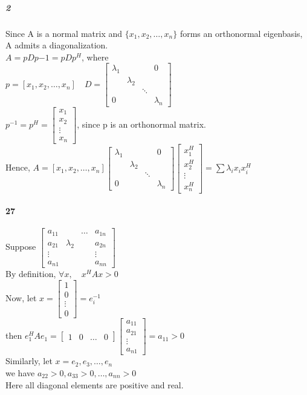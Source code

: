 \documentclass[10pt,letter]{article}
\begin{document}
\subparagraph{2}
Since A is a normal matrix and $\{x_1, x_2,\dots,x_n \}$ forms an orthonormal eigenbasis, A admits a diagonalization. \\
$A=pDp{-1}=pDp^H$, where \\
$p=[x_1, x_2,\dots,x_n]\quad D=\begin{bmatrix}
\lambda_1& & &0\\
 &\lambda_2& & \\
& &\ddots& \\
0& & & \lambda_n
\end{bmatrix}$\\
$p^{-1}=p^H=\begin{bmatrix}
x_1\\x_2\\\vdots\\x_n
\end{bmatrix}$, since p is an orthonormal matrix. \\
Hence,
$A=[x_1, x_2,\dots,x_n]\begin{bmatrix}
\lambda_1& & &0\\
&\lambda_2& & \\
& &\ddots& \\
0& & & \lambda_n
\end{bmatrix}\begin{bmatrix}
x_1^H\\x_2^H\\\vdots\\x_n^H
\end{bmatrix}=\sum \lambda_ix_ix_i^H$
\paragraph{27}
Suppose $\begin{bmatrix}
a_{11}& &\dots &a_{1n}\\
a_{21}&\lambda_2& &a_{2n}\\
\vdots& & &\vdots\\
a_{n1}& & & a_{nn}
\end{bmatrix}$\\
By definition, $\forall x, \quad x^HAx>0$\\
Now, let $x=\begin{bmatrix}
1\\0\\\vdots\\0
\end{bmatrix}=e_i^{-1}$\\
then $e_1^HAe_1=\begin{bmatrix}
1&0&\dots&0
\end{bmatrix}\begin{bmatrix}
a_{11}\\a_{21}\\\vdots\\a_{n1}
\end{bmatrix}=a_{11}>0$\\
Similarly, let $x=e_2,e_3,\dots, e_n$\\
we have $a_{22}>0, a_{33}>0,\dots,a_{nn}>0$\\
Here all diagonal elements are positive and real.
\end{document}
